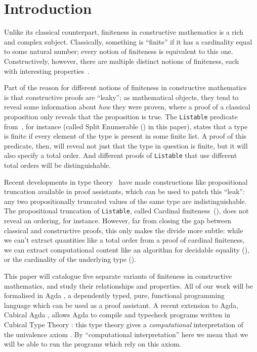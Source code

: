 \section{Introduction}
Unlike its classical counterpart, finiteness in constructive mathematics is a
rich and complex subject.
Classically, something is ``finite'' if it has a cardinality equal to some
natural number; every notion of finiteness is equivalent to this one.
Constructively, however, there are multiple distinct notions of finiteness, each
with interesting properties~\cite{coquandConstructivelyFinite2010,
  firsovVariationsNoetherianness2016, fruminFiniteSetsHomotopy2018}.

Part of the reason for different notions of finiteness in constructive
mathematics is that constructive proofs are ``leaky''; as mathematical
objects, they tend to reveal some information about \emph{how} they were proven,
where a proof of a classical proposition only reveals that the proposition is
true.
The \verb+Listable+ predicate
from~\cite{firsovDependentlyTypedProgramming2015}, for instance (called Split
Enumerable () in this paper),
states that a type is finite if every element of the type is present in some
finite list.
A proof of this predicate, then, will reveal not just that the type in question
is finite, but it will also specify a total order.
And different proofs of \verb+Listable+ that use different total orders will be
distinguishable.

Recent developments in type
theory~\cite[in particular Cubical Agda][]{vezzosiCubicalAgdaDependently2019}
have made constructions like propositional truncation available in proof
assistants, which
can be used to patch this ``leak'': any two propositionally truncated values of
the same type are indistinguishable.
The propositional truncation of \verb+Listable+, called Cardinal
finiteness~(), does not reveal an ordering, for instance.
However, far from closing the gap between classical and constructive proofs,
this only makes the divide more subtle: while we can't extract quantities like a
total order from a proof of cardinal finiteness, we can extract computational
content like an algorithm for decidable equality
(), or the cardinality of the underlying type
().

This paper will catalogue five separate variants of finiteness in constructive
mathematics, and study their relationships and properties.
All of our work will be formalised in Agda
\cite{norellDependentlyTypedProgramming2008}, a
dependently typed, pure, functional programming language which can be
used as a proof assistant.
A recent extension to Agda, Cubical Agda
\cite{vezzosiCubicalAgdaDependently2019}, allows Agda to compile and typecheck
programs written in Cubical Type Theory \cite{cohenCubicalTypeTheory2016}: this
type theory gives a \emph{computational} interpretation of the univalence axiom
\cite{hottbook}.
By ``computational interpretation'' here we mean that we will be able to run the
programs which rely on this axiom.

